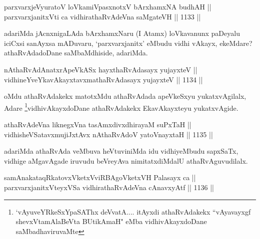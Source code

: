 
\begin{shl}
parxvarxjeVyuratoV loVkamiVpasxnotxV bArxhamxNA budhAH || \\
parxvarxjanitxVti ca vidhirathaRvAdeVna saMgateVH ||  1133 ||  
\end{shl}

\begin{artha}
adariMda jAcnxnigaLAda bArxhamxNaru (I Atamx) loVkavanunx paDeyalu iciCxsi sanAyxsa mADuvaru, `parxvarxjanitx' eMbudu vidhi vAkayx, ekeMdare? athaRvAdadoDane saMbaMdhiside, adariMda.
\end{artha}


\begin{shl}
nAthaRvAdAnatxrApeVkASx hayxthaRvAdasayx yujayxteV || \\
vidhineYveYkavAkayxtavxmathaRvAdasayx yujayxteV ||  1134 ||  
\end{shl}

\begin{artha}
oMdu athaRvAdakekx matotxMdu athaRvAdada apeVkeSxyu yukatxvAgilalx, Adare \footnote{`vAyuveYRkeSxYpaSAThx deVvatA.... itAyxdi athaRvAdakekx ``vAyavayxgf shevxVtamAlaBeVta BUtikAmaH" eMba vidhivAkayxdoDane saMbadhaviruvaMte}vidhivAkayxdoDane athaRvAdakekx EkavAkayxteyu yukatxvAgide.
\end{artha}

\begin{shl}
athaRvAdeVna liknegxVna tasAmxdivxdhirayaM suPxTaH || \\
vidhisheVSatavxmujiJxtAvx nAthaRvAdoV yatoV\s nayxtaH ||  1135 ||  
\end{shl}

\begin{artha}
adariMda athaRvAda veMbuva heVtuviniMda idu vidhiyeMbudu sapxSaTx, vidhige aMgavAgade iruvudu beVreyAva nimitatxdiMdalU athaRvAguvudilalx.
\end{artha}


\begin{shl}
samAnakataqRkatovxVketxVviRBAgoVketxVH Palasayx ca || \\
parxvarxjanitxVteyxVSa vidhirathaRvAdeVna cAnavxyAtf ||  1136 ||  
\end{shl}

